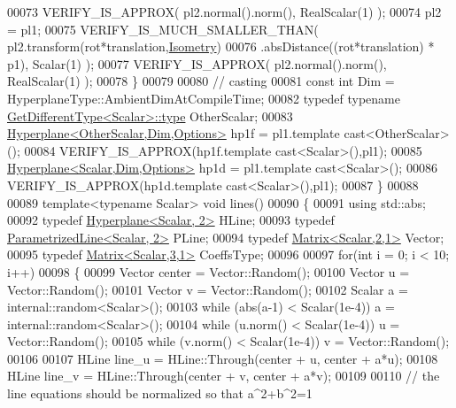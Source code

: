 \begin{DoxyCode}
00073     VERIFY\_IS\_APPROX( pl2.normal().norm(), RealScalar(1) );
00074     pl2 = pl1;
00075     VERIFY\_IS\_MUCH\_SMALLER\_THAN( pl2.transform(rot*translation,\hyperlink{group__enums_ggaee59a86102f150923b0cac6d4ff05107a080cd5366173608f701cd945c2335568}{Isometry})
00076                                  .absDistance((rot*translation) * p1), Scalar(1) );
00077     VERIFY\_IS\_APPROX( pl2.normal().norm(), RealScalar(1) );
00078   \}
00079 
00080   \textcolor{comment}{// casting}
00081   \textcolor{keyword}{const} \textcolor{keywordtype}{int} Dim = HyperplaneType::AmbientDimAtCompileTime;
00082   \textcolor{keyword}{typedef} \textcolor{keyword}{typename} \hyperlink{struct_get_different_type}{GetDifferentType<Scalar>::type} OtherScalar;
00083   \hyperlink{group___geometry___module_class_eigen_1_1_hyperplane}{Hyperplane<OtherScalar,Dim,Options>} hp1f = pl1.template 
      cast<OtherScalar>();
00084   VERIFY\_IS\_APPROX(hp1f.template cast<Scalar>(),pl1);
00085   \hyperlink{group___geometry___module_class_eigen_1_1_hyperplane}{Hyperplane<Scalar,Dim,Options>} hp1d = pl1.template cast<Scalar>();
00086   VERIFY\_IS\_APPROX(hp1d.template cast<Scalar>(),pl1);
00087 \}
00088 
00089 \textcolor{keyword}{template}<\textcolor{keyword}{typename} Scalar> \textcolor{keywordtype}{void} lines()
00090 \{
00091   \textcolor{keyword}{using} std::abs;
00092   \textcolor{keyword}{typedef} \hyperlink{group___geometry___module_class_eigen_1_1_hyperplane}{Hyperplane<Scalar, 2>} HLine;
00093   \textcolor{keyword}{typedef} \hyperlink{group___geometry___module_class_eigen_1_1_parametrized_line}{ParametrizedLine<Scalar, 2>} PLine;
00094   \textcolor{keyword}{typedef} \hyperlink{group___core___module_class_eigen_1_1_matrix}{Matrix<Scalar,2,1>} Vector;
00095   \textcolor{keyword}{typedef} \hyperlink{group___core___module}{Matrix<Scalar,3,1>} CoeffsType;
00096 
00097   \textcolor{keywordflow}{for}(\textcolor{keywordtype}{int} i = 0; i < 10; i++)
00098   \{
00099     Vector center = Vector::Random();
00100     Vector u = Vector::Random();
00101     Vector v = Vector::Random();
00102     Scalar a = internal::random<Scalar>();
00103     \textcolor{keywordflow}{while} (abs(a-1) < Scalar(1e-4)) a = internal::random<Scalar>();
00104     \textcolor{keywordflow}{while} (u.norm() < Scalar(1e-4)) u = Vector::Random();
00105     \textcolor{keywordflow}{while} (v.norm() < Scalar(1e-4)) v = Vector::Random();
00106 
00107     HLine line\_u = HLine::Through(center + u, center + a*u);
00108     HLine line\_v = HLine::Through(center + v, center + a*v);
00109 
00110     \textcolor{comment}{// the line equations should be normalized so that a^2+b^2=1}

\end{DoxyCode}
